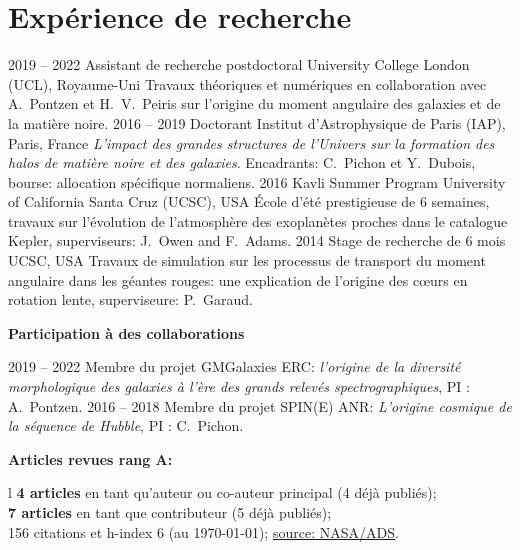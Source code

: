 \documentclass[french]{cv-style}
\renewcommand{\hl}[1]{\textbf{\color{darkred}#1}}
\begin{document}
%
%
%

\section{Expérience de recherche}
\begin{entrylist}
%
\entry
{2019 -- 2022}
{Assistant de recherche postdoctoral}
{University College London (UCL), Royaume-Uni}
{Travaux théoriques et numériques en collaboration avec A.~Pontzen et H.~V.~Peiris sur l'origine du moment angulaire des galaxies et de la matière noire.}
%
\entry
{2016 -- 2019}
{Doctorant}
{Institut d'Astrophysique de Paris (IAP), Paris, France}
{\emph{L'impact des grandes structures de l'Univers sur la formation des halos de matière noire et des galaxies}. Encadrants: C.~Pichon et Y.~Dubois, bourse: allocation spécifique normaliens.}
%
\entry
{2016}
{Kavli Summer Program}
{University of California Santa Cruz (UCSC), USA}
{École d'été prestigieuse de 6 semaines, travaux sur l'évolution de l'atmosphère des exoplanètes proches dans le catalogue Kepler, superviseurs: J.~Owen and F.~Adams.}
%
\entry
{2014}
{Stage de recherche de 6 mois}
{UCSC, USA}
{Travaux de simulation sur les processus de transport du moment angulaire dans les géantes rouges: une explication de l'origine des cœurs en rotation lente, superviseure: P.~Garaud.}
\end{entrylist}

\vspace{-1em}
\textbf{Participation à des collaborations}

\begin{entrylist}
\entry
{2019 -- 2022}
{Membre du projet GMGalaxies}
{}
{ERC: \emph{l'origine de la diversité morphologique des galaxies à l'ère des grands relevés spectrographiques}, PI : A.~Pontzen.}
%
\entry
{2016 -- 2018}
{Membre du projet SPIN(E)}
{}
{ANR: \emph{L'origine cosmique de la séquence de Hubble}, PI : C.~Pichon.}
\end{entrylist}

\vspace{-1em}
\textbf{Articles revues rang A:}%
\begin{tabular}[t]{l}
  \hl{4 articles} en tant qu'auteur ou co-auteur principal (4 déjà publiés);\\
  \hl{7 articles} en tant que contributeur (5 déjà publiés);\\
  156 citations et h-index 6 (au \today); \href{https://ui.adsabs.harvard.edu/search/filter_database_fq_database=AND&filter_database_fq_database=database%3A%22astronomy%22&fq=%7B!type%3Daqp%20v%3D%24fq_database%7D&fq_database=(database%3A%22astronomy%22)&p_=0&q=((author%3A%22Cadiou%2C%20C%22))&sort=date%20desc%2C%20bibcode%20desc}{\setul{1pt}{.4pt}%
  \ul{source: NASA/ADS}}.
\end{tabular}
\end{document}
